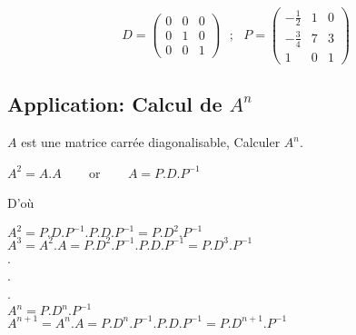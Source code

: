 \documentclass[a4paper,12pt,french]{article}
\begin{document}
	\[ D=\begin{pmatrix}
		0 & 0 & 0  \\
		0 & 1 & 0\\
		0 & 0 & 1
		
	\end{pmatrix} ~~~;~~~P=\begin{pmatrix}
		-\frac{1}{2} & 1 & 0  \\
		-\frac{3}{4} & 7 & 3\\
		1& 0 & 1
		
	\end{pmatrix}
	\]
	\subsection{Application: Calcul de $A^n$}
	$A$ est une matrice carrée diagonalisable, Calculer $A^n$.
	\begin{center}
		$A^2=A.A$ ~~~ or ~~~ $A=P.D.P^{-1}$\\
	\end{center}
	D'où 
	\begin{center}
		$A^{2}=P.D.P^{-1}.P.D.P^{-1}=P.D^2.P^{-1}$\\
		$A^{3}=A^{2}.A=P.D^{2}.P^{-1}.P.D.P^{-1}=P.D^3.P^{-1}$\\
		.\\
		.\\
		.\\
		$A^n=P.D^n.P^{-1}$\\
		$A^{n+1}=A^n.A=P.D^n.P^{-1}.P.D.P^{-1}=P.D^{n+1}.P^{-1}$ 
		
	\end{center}
	
	
	
	
	
\end{document}
